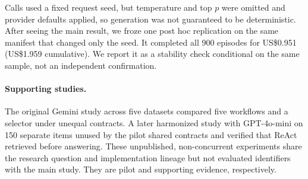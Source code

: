 Calls used a fixed request seed, but temperature and top $p$ were omitted and
provider defaults applied, so generation was not guaranteed to be deterministic.
After seeing the main result, we froze one post hoc replication on the same
manifest that changed only the seed. It completed all 900 episodes for
US\$0.951 (US\$1.959 cumulative). We report it as a stability check conditional
on the same sample, not an independent confirmation.

\paragraph{Supporting studies.}
The original Gemini study across five datasets compared five workflows and a
selector under unequal contracts. A later harmonized study with GPT-4o-mini on
150 separate items unused by the pilot shared contracts and verified that ReAct retrieved
before answering. These unpublished, non-concurrent experiments share the
research question and implementation lineage but not evaluated identifiers
with the main study. They are pilot and supporting evidence, respectively.
